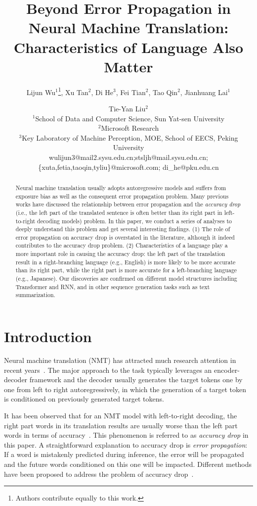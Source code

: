 \documentclass[11pt,a4paper]{article}
\title{Beyond Error Propagation in Neural Machine Translation: \\
Characteristics of Language Also Matter}
\author{Lijun Wu$^1$\thanks{Authors contribute equally to this work.}, Xu Tan$^2$\footnotemark[1], Di He$^3$, Fei Tian$^2$, Tao Qin$^2$, Jianhuang Lai$^1$ \and Tie-Yan Liu$^2$\\
$^1$School of Data and Computer Science, Sun Yat-sen University\\
\quad$^2$Microsoft Research \\
\quad$^3$Key Laboratory of Machine Perception, MOE, School of EECS, Peking University \\
wulijun3@mail2.sysu.edu.cn;\;stsljh@mail.sysu.edu.cn;\;\\
\{xuta,fetia,taoqin,tyliu\}@microsoft.com;\; di\_he@pku.edu.cn\;
}
\date{}
\begin{document}
\maketitle
\begin{abstract}
Neural machine translation usually adopts autoregressive models and suffers from exposure bias as well as the consequent error propagation problem. Many previous works have discussed the relationship between error propagation and the \emph{accuracy drop} (i.e., the left part of the translated sentence is often better than its right part in left-to-right decoding models) problem. In this paper, we conduct a series of analyses to deeply understand this problem and get several interesting findings. (1) The role of error propagation on accuracy drop is overstated in the literature, although it indeed contributes to the accuracy drop problem. (2) Characteristics of a language play a more important role in causing the accuracy drop: the left part of the translation result in a right-branching language (e.g., English) is more likely to be more accurate than its right part, while the right part is more accurate for a left-branching language (e.g., Japanese). Our discoveries are confirmed on different model structures including Transformer and RNN, and in other sequence generation tasks such as text summarization.


\end{abstract}

\section{Introduction}
Neural machine translation (NMT) has attracted much research attention in recent years~\cite{bahdanau2014neural,DBLP:conf/naacl/ShenTHQL18,DBLP:conf/coling/SongTHLQL18,DBLP:conf/icml/XiaTTQYL18,he2016dual,wu2017adversarial,rl_study}. The major approach to the task typically leverages an encoder-decoder framework \cite{DBLP:conf/emnlp/ChoMGBBSB14,DBLP:conf/nips/SutskeverVL14} and the decoder usually generates the target tokens one by one from left to right autoregressively, in which the generation of a target token is conditioned on previously generated target tokens.

It has been observed that for an NMT model with left-to-right decoding, the right part words in its translation results are usually worse than the left part words in terms of accuracy~\cite{DBLP:journals/corr/abs-1801-05122,DBLP:conf/nips/BengioVJS15,DBLP:journals/corr/RanzatoCAZ15,DBLP:journals/corr/abs-1803-05567,DBLP:conf/naacl/LiuUFS16,DBLP:conf/aaai/LiuFUS16}. This phenomenon is referred to as \textit{accuracy drop} in this paper. A straightforward explanation to accuracy drop is  \textit{error propagation}: If a word is mistakenly predicted during inference, the error will be propagated and the future words conditioned on this one will be impacted. Different methods have been proposed to address the problem of accuracy drop~\citep{DBLP:conf/aaai/LiuFUS16,DBLP:conf/naacl/LiuUFS16,DBLP:journals/corr/abs-1803-05567}.
\end{document}
